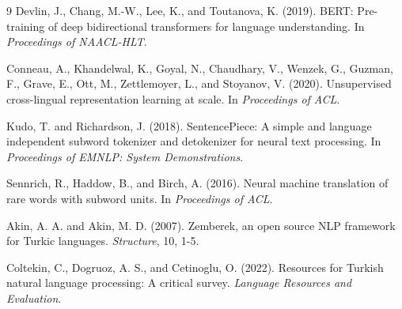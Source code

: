 \documentclass[11pt]{article}
\begin{document}
\begin{thebibliography}{9}
Devlin, J., Chang, M.-W., Lee, K., and Toutanova, K. (2019). BERT: Pre-training of deep bidirectional transformers for language understanding. In \textit{Proceedings of NAACL-HLT}.

Conneau, A., Khandelwal, K., Goyal, N., Chaudhary, V., Wenzek, G., Guzman, F., Grave, E., Ott, M., Zettlemoyer, L., and Stoyanov, V. (2020). Unsupervised cross-lingual representation learning at scale. In \textit{Proceedings of ACL}.

Kudo, T. and Richardson, J. (2018). SentencePiece: A simple and language independent subword tokenizer and detokenizer for neural text processing. In \textit{Proceedings of EMNLP: System Demonstrations}.

Sennrich, R., Haddow, B., and Birch, A. (2016). Neural machine translation of rare words with subword units. In \textit{Proceedings of ACL}.

Akin, A. A. and Akin, M. D. (2007). Zemberek, an open source NLP framework for Turkic languages. \textit{Structure}, 10, 1-5.

Coltekin, C., Dogruoz, A. S., and Cetinoglu, O. (2022). Resources for Turkish natural language processing: A critical survey. \textit{Language Resources and Evaluation}.
\end{thebibliography}
\end{document}
